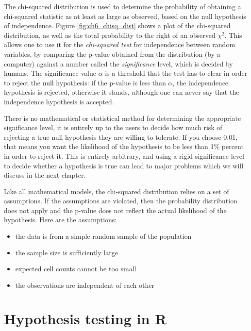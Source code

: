 \documentclass[
]{book}
\providecommand{\tightlist}{%
  \setlength{\itemsep}{0pt}\setlength{\parskip}{0pt}}
\theoremstyle{definition}
\theoremstyle{definition}
\theoremstyle{definition}
\theoremstyle{remark}
\begin{document}
The chi-squared distribution is used to determine the probability of obtaining a chi-squared statistic as at least as large as observed, based on the null hypothesis of independence. Figure \ref{fig:ch6_chisq_dist} shows a plot of the chi-squared distribution, as well as the total probability to the right of an observed \(\chi^2\). This allows one to use it for the \emph{chi-squared test} for independence between random variables, by comparing the p-value obtained from the distribution (by a computer) against a number called the \emph{significance} level, which is decided by humans. The significance value \(\alpha\) is a threshold that the test has to clear in order to reject the null hypothesis: if the p-value is less than \(\alpha\), the independence hypothesis is rejected, otherwise it stands, although one can never say that the independence hypothesis is accepted.

There is no mathematical or statistical method for determining the appropriate significance level, it is entirely up to the users to decide how much risk of rejecting a true null hypothesis they are willing to tolerate. If you choose 0.01, that means you want the likelihood of the hypothesis to be less than 1\% percent in order to reject it. This is entirely arbitrary, and using a rigid significance level to decide whether a hypothesis is true can lead to major problems which we will discuss in the next chapter.

Like all mathematical models, the chi-squared distribution relies on a set of assumptions. If the assumptions are violated, then the probability distribution does not apply and the p-value does not reflect the actual likelihood of the hypothesis. Here are the assumptions:

\begin{itemize}
\tightlist
\item
  the data is from a simple random sample of the population
\item
  the sample size is sufficiently large
\item
  expected cell counts cannot be too small
\item
  the observations are independent of each other
\end{itemize}

\hypertarget{hypothesis-testing-in-r}{%
\section{Hypothesis testing in R}\label{hypothesis-testing-in-r}}
\end{document}
